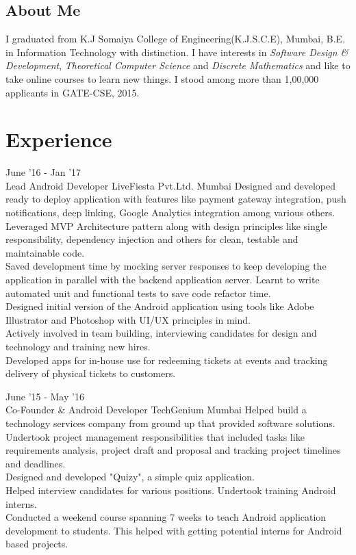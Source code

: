 \documentclass[10pt, a4paper, sans]{moderncv}
\title{}
\begin{document}
\makecvtitle

\subsection{\hfil About Me \hfil}
I graduated from K.J Somaiya College of Engineering(K.J.S.C.E), Mumbai, B.E. in Information Technology with distinction. I have interests in \emph{Software Design \& Development}, \emph{Theoretical Computer Science} and \emph{Discrete Mathematics} and like to take online courses to learn new things. I stood  among more than 1,00,000 applicants in GATE-CSE, 2015.

\section{Experience}
\cventry
{June '16 - Jan '17 \\ {\faAndroid} {\faUsers}}
{Lead Android Developer}
{LiveFiesta Pvt.Ltd.}
{Mumbai}
{}
{
{\faCaretRight} Designed and developed ready to deploy application with features like payment gateway integration, push notifications, deep linking, Google Analytics integration among various others. \\
{\faCaretRight} Leveraged MVP Architecture pattern along with design principles like single responsibility, dependency injection and others for clean, testable and maintainable code. \\
{\faCaretRight} Saved development time by mocking server responses to keep developing the application in parallel with the backend application server. Learnt to write automated unit and functional tests to save code refactor time. \\
{\faCaretRight} Designed initial version of the Android application using tools like Adobe Illustrator and Photoshop with UI/UX principles in mind. \\
{\faCaretRight} Actively involved in team building, interviewing candidates for design and technology and training new hires.\\
{\faCaretRight} Developed apps for in-house use for redeeming tickets at events and tracking delivery of physical tickets to customers.
}

\cventry
{June '15 - May '16 \\ {\faAndroid} {\faBriefcase}}
{Co-Founder \& Android Developer}
{TechGenium}
{Mumbai}
{}
{
{\faCaretRight} Helped build a technology services company from ground up that provided software solutions. \\
{\faCaretRight} Undertook project management responsibilities that included tasks like requirements analysis, project draft and proposal and tracking project timelines and deadlines. \\
{\faCaretRight} Designed and developed "Quizy", a simple quiz application. \\
{\faCaretRight} Helped interview candidates for various positions. Undertook training Android interns. \\
{\faCaretRight} Conducted a weekend course spanning 7 weeks to teach Android application development to students. This helped with getting potential interns for Android based projects.
}
\end{document}
